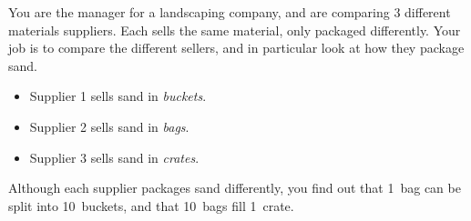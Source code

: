 \documentclass[12pt]{exam}
\begin{document}
\begin{questions}

\question
You are the manager for a landscaping company, and are comparing 3 different materials suppliers. Each sells the same material, only packaged differently. Your job is to compare the different sellers, and in particular look at how they package sand.

\begin{itemize}
\item Supplier 1 sells sand in \textit{buckets}.
\item Supplier 2 sells sand in \textit{bags}. 
\item Supplier 3 sells sand in \textit{crates}.
\end{itemize}

Although each supplier packages sand differently, you find out that 1~bag can be split into 10~buckets, and that 10~bags fill 1~crate.


\end{questions}
\end{document}
